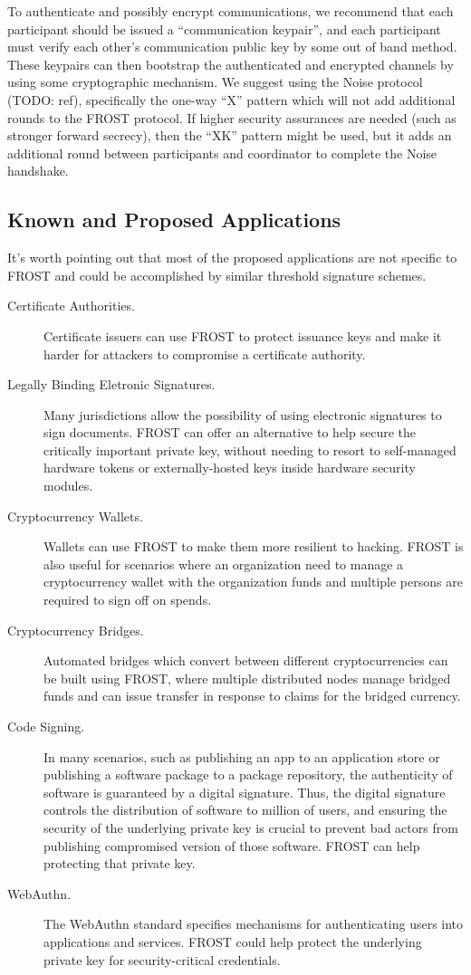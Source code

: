 To authenticate and possibly encrypt communications, we recommend that each
participant should be issued a ``communication keypair'', and each participant
must verify each other's communication public key by some out of band method.
These keypairs can then bootstrap the authenticated and encrypted channels by
using some cryptographic mechanism. We suggest using the Noise protocol (TODO:
ref), specifically the one-way ``X'' pattern which will not add additional
rounds to the FROST protocol. If higher security assurances are needed (such as
stronger forward secrecy), then the ``XK'' pattern might be used, but it adds an
additional round between participants and coordinator to complete the Noise
handshake.

\subsection{Known and Proposed Applications}

It's worth pointing out that most of the proposed applications are not specific
to FROST and could be accomplished by similar threshold signature schemes.

\begin{description}
    \item[Certificate Authorities.] Certificate issuers can use FROST to protect
    issuance keys and make it harder for attackers to compromise a certificate
    authority.
    \item[Legally Binding Eletronic Signatures.] Many jurisdictions allow the
    possibility of using electronic signatures to sign documents. FROST can
    offer an alternative to help secure the critically important private key,
    without needing to resort to self-managed hardware tokens or
    externally-hosted keys inside hardware security modules.
    \item[Cryptocurrency Wallets.] Wallets can use FROST to make them more
    resilient to hacking. FROST is also useful for scenarios where an
    organization need to manage a cryptocurrency wallet with the organization
    funds and multiple persons are required to sign off on spends.
    \item[Cryptocurrency Bridges.] Automated bridges which convert between
    different cryptocurrencies can be built using FROST, where multiple
    distributed nodes manage bridged funds and can issue transfer in response
    to claims for the bridged currency.
    \item[Code Signing.] In many scenarios, such as publishing an app to an
    application store or publishing a software package to a package repository,
    the authenticity of software is guaranteed by a digital signature. Thus, the
    digital signature controls the distribution of software to million of users,
    and ensuring the security of the underlying private key is crucial to
    prevent bad actors from publishing compromised version of those software.
    FROST can help protecting that private key.
    \item[WebAuthn.] The WebAuthn standard specifies mechanisms for
    authenticating users into applications and services. FROST could help
    protect the underlying private key for security-critical credentials.
\end{description}
